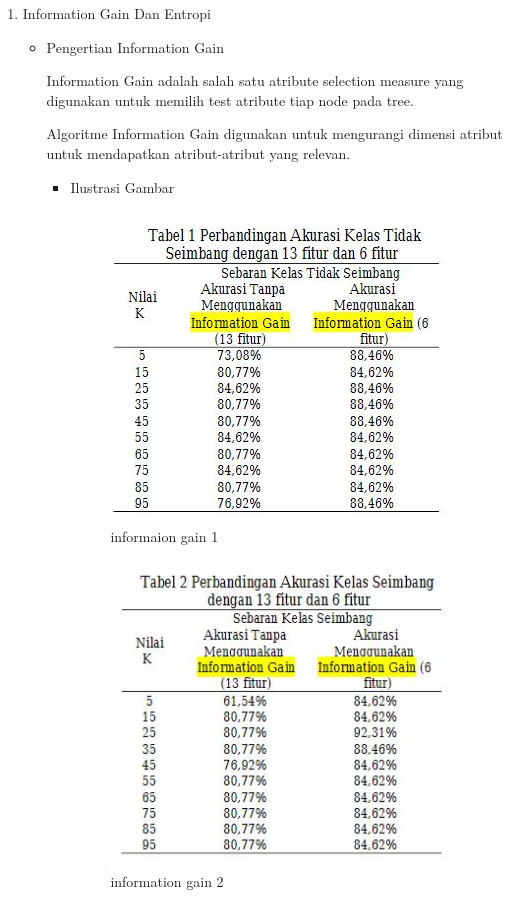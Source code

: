 \begin{enumerate}
\begin{itemize}
\par
\end{itemize}
\item Information Gain Dan Entropi
\begin{itemize}
\item Pengertian Information Gain
\par Information Gain adalah salah satu atribute selection measure yang digunakan untuk memilih test atribute tiap node pada tree.
\par Algoritme Information Gain digunakan untuk mengurangi dimensi atribut untuk mendapatkan atribut-atribut yang relevan. 
\par

\begin{itemize}
\item Ilustrasi Gambar
\par


\begin{figure}[ht]
\centering
\includegraphics[scale=0.6]{figures/information1.jpg}
\caption{informaion gain 1}
\label{contoh}
\end{figure}


\begin{figure}[ht]
\centering
\includegraphics[scale=0.6]{figures/information2.jpg}
\caption{information gain 2}
\label{contoh}
\end{figure}


\end{itemize}
\end{itemize}
\end{enumerate}
